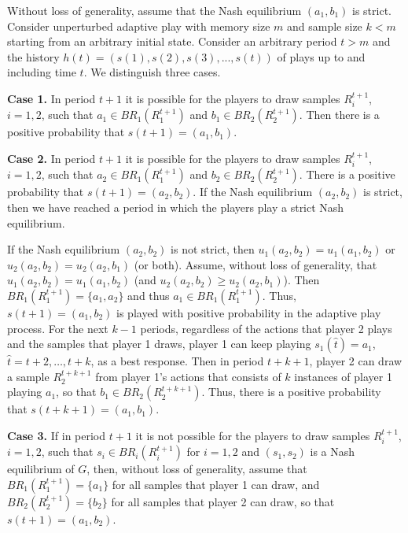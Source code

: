 \documentclass[11.5pt]{article}
\begin{document}
Without loss of generality, assume that the Nash equilibrium $(a_1,b_1)$ is strict. 
%
Consider unperturbed adaptive play with memory size $m$ and sample size $k < m$ starting from an arbitrary initial state. Consider an arbitrary period $t>m$ and the history $h(t) = (s(1), s(2), s(3), ..., s(t))$ of plays up to and including time $t$. 
%
We distinguish three cases.

{\bf Case 1. } In period $t+1$ it is possible for the players to draw samples $R_i^{t+1}$, $i=1,2$, such that $a_1\in BR_1(R_1^{t+1})$ and $b_1\in BR_2(R_2^{t+1})$. Then there is a positive probability that $s(t+1)=(a_1,b_1)$. 

{\bf Case 2. } In period $t+1$ it is possible for the players to draw samples $R_i^{t+1}$, $i=1,2$, such that $a_2\in BR_1(R_1^{t+1})$ and $b_2\in BR_2(R_2^{t+1})$. There is a positive probability that $s(t+1)=(a_2,b_2)$. If the Nash equilibrium $(a_2,b_2)$ is strict, then we have reached a period in which the players play a strict Nash equilibrium.  
%

If the Nash equilibrium $(a_2,b_2)$ is not strict, then $u_1(a_2,b_2) = u_1(a_1,b_2)$ or $u_2(a_2,b_2) = u_2(a_2,b_1)$ (or both). Assume, without loss of generality, that $u_1(a_2,b_2) = u_1(a_1,b_2)$ (and $u_2(a_2,b_2) \geq u_2(a_2,b_1)$). Then $BR_1(R_1^{t+1})=\{a_1,a_2\}$ and thus $a_1\in BR_1(R_1^{t+1})$. Thus, $s(t+1)=(a_1,b_2)$ is played with positive probability in the adaptive play process. For the next $k-1$ periods, regardless of the actions that player 2 plays and the samples that player 1 draws, player 1 can keep playing $s_1(\hat{t})=a_1$, $\hat{t}=t+2, \ldots, t+k$, as a best response. Then in period $t+k+1$, player 2 can draw a sample $R_2^{t+k+1}$ from player 1's actions that consists of $k$ instances of player 1 playing $a_1$, so that $b_1\in BR_2(R_2^{t+k+1})$. Thus, there is a positive probability that $s(t+k+1)=(a_1,b_1)$. 

{\bf Case 3.} If in period $t+1$ it is not possible for the players to draw samples $R_i^{t+1}$, $i=1,2$, such that $s_i\in BR_i(R_i^{t+1})$ for $i=1,2$ and $(s_1,s_2)$ is a Nash equilibrium of $G$, then, without loss of generality, assume that $BR_1(R_1^{t+1})=\{a_1\}$ for all samples that player 1 can draw, and $BR_2(R_2^{t+1})=\{b_2\}$ for all samples that player 2 can draw, so that $s(t+1)=(a_1,b_2)$. 
%
\end{document}
